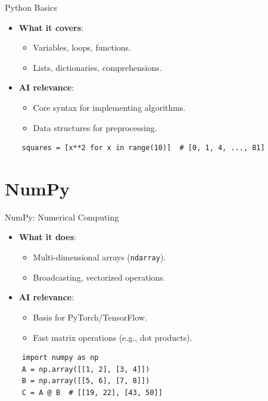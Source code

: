 \documentclass{beamer}
\begin{document}
\begin{frame}{Python Basics}
  \begin{itemize}
    \item \textbf{What it covers}:
      \begin{itemize}
        \item Variables, loops, functions.
        \item Lists, dictionaries, comprehensions.
      \end{itemize}
    \item \textbf{AI relevance}:
      \begin{itemize}
        \item Core syntax for implementing algorithms.
        \item Data structures for preprocessing.
      \end{itemize}
  \end{itemize}
  \begin{example}
    \begin{lstlisting}
    squares = [x**2 for x in range(10)]  # [0, 1, 4, ..., 81]
    \end{lstlisting}
  \end{example}
\end{frame}

\section{NumPy}

\begin{frame}{NumPy: Numerical Computing}
  \begin{itemize}
    \item \textbf{What it does}:
      \begin{itemize}
        \item Multi-dimensional arrays (\texttt{ndarray}).
        \item Broadcasting, vectorized operations.
      \end{itemize}
    \item \textbf{AI relevance}:
      \begin{itemize}
        \item Basis for PyTorch/TensorFlow.
        \item Fast matrix operations (e.g., dot products).
      \end{itemize}
  \end{itemize}
  \begin{example}
    \begin{lstlisting}
    import numpy as np
    A = np.array([[1, 2], [3, 4]])
    B = np.array([[5, 6], [7, 8]])
    C = A @ B  # [[19, 22], [43, 50]]
    \end{lstlisting}
  \end{example}
\end{frame}
\end{document}
